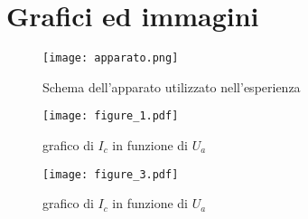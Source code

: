 \section{Grafici ed immagini}
\begin{figure}[h]
	\centering
	\texttt{[image: apparato.png]}
	\caption{Schema dell'apparato utilizzato nell'esperienza}
	\label{f:apparato}
\end{figure}

\begin{figure}[h]
	\centering
	\texttt{[image: figure\_1.pdf]}
	\caption{grafico di $I_c$ in funzione di $U_a$}
	\label{f:figura_1}
\end{figure}

\begin{figure}[h]
	\centering
	\texttt{[image: figure\_3.pdf]}
	\caption{grafico di $I_c$ in funzione di $U_a$}
	\label{f:figura_3}
\end{figure}
